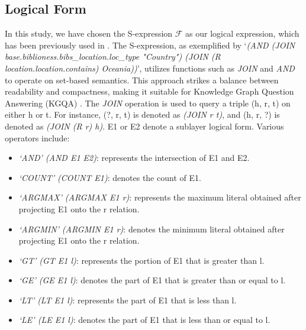 \subsection{Logical Form}
In this study, we have chosen the S-expression $\mathcal{F}$ as our logical expression, which has been previously used in \cite{chatkbqa,decaf}. The S-expression, as exemplified by `\textit{(AND (JOIN base.biblioness.bibs\_location.loc\_type "Country") (JOIN (R location.location.contains) Oceania))}', utilizes functions such as \textit{JOIN} and \textit{AND} to operate on set-based semantics. This approach strikes a balance between readability and compactness, making it suitable for Knowledge Graph Question Answering (KGQA) \cite{gu2021beyond}.
The \textit{JOIN} operation is used to query a triple (h, r, t) on either h or t. For instance, (?, r, t) is denoted as \textit{(JOIN r t)}, and (h, r, ?) is denoted as \textit{(JOIN (R r) h)}.
E1 or E2 denote a sublayer logical form. Various operators include:
\begin{itemize}
    \item \textit{`AND' (AND E1 E2)}: represents the intersection of E1 and E2.
    \item \textit{`COUNT' (COUNT E1)}: denotes the count of E1.
    \item \textit{`ARGMAX' (ARGMAX E1 r)}: represents the maximum literal obtained after projecting E1 onto the r relation.
    \item \textit{`ARGMIN' (ARGMIN E1 r)}: denotes the minimum literal obtained after projecting E1 onto the r relation.
    \item \textit{`GT' (GT E1 l)}: represents the portion of E1 that is greater than l.
    \item \textit{`GE' (GE E1 l)}: denotes the part of E1 that is greater than or equal to l.
    \item \textit{`LT' (LT E1 l)}: represents the part of E1 that is less than l.
    \item \textit{`LE' (LE E1 l)}: denotes the part of E1 that is less than or equal to l.
\end{itemize}


